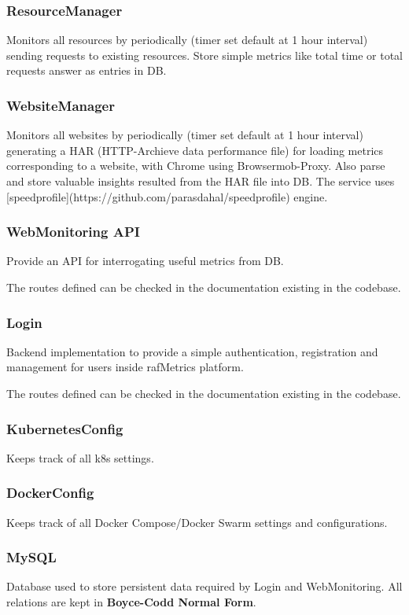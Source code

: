\subsubsection{ResourceManager}
Monitors all resources by periodically (timer set default at 1 hour interval) sending requests to existing resources.
Store simple metrics like total time or total requests answer as entries in DB.

\subsubsection{WebsiteManager}
Monitors all websites by periodically (timer set default at 1 hour interval) generating a HAR (HTTP-Archieve data performance file) for loading metrics corresponding to a website, with Chrome using Browsermob-Proxy.
Also parse and store valuable insights resulted from the HAR file into DB.
The service uses [speedprofile](https://github.com/parasdahal/speedprofile) engine.

\subsubsection{WebMonitoring API}
Provide an API for interrogating useful metrics from DB.

The routes defined can be checked in the documentation existing in the codebase.

\subsubsection{Login}
Backend implementation to provide a simple authentication, registration and management for users inside rafMetrics platform.

The routes defined can be checked in the documentation existing in the codebase.

\subsubsection{KubernetesConfig}
Keeps track of all k8s settings.

\subsubsection{DockerConfig}
Keeps track of all Docker Compose/Docker Swarm settings and configurations.

\subsubsection{MySQL}
Database used to store persistent data required by Login and WebMonitoring.
All relations are kept in \textbf{Boyce-Codd Normal Form}.

